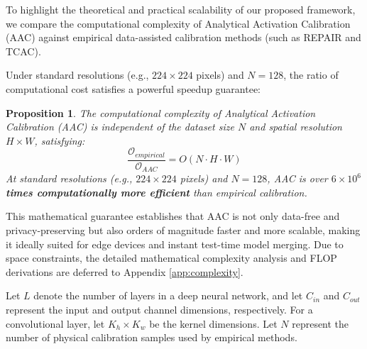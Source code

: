 \documentclass{article}
\theoremstyle{plain}
\newtheorem{proposition}[theorem]{Proposition}
\theoremstyle{definition}
\theoremstyle{remark}
\begin{document}
To highlight the theoretical and practical scalability of our proposed framework, we compare the computational complexity of Analytical Activation Calibration (AAC) against empirical data-assisted calibration methods (such as REPAIR and TCAC).

Under standard resolutions (e.g., $224 \times 224$ pixels) and $N=128$, the ratio of computational cost satisfies a powerful speedup guarantee:

\begin{proposition}
The computational complexity of Analytical Activation Calibration (AAC) is independent of the dataset size $N$ and spatial resolution $H \times W$, satisfying:
\begin{equation}
    \frac{\mathcal{O}_{empirical}}{\mathcal{O}_{AAC}} = O(N \cdot H \cdot W)
\end{equation}
At standard resolutions (e.g., $224 \times 224$ pixels) and $N=128$, AAC is over \textbf{$6 \times 10^6$ times computationally more efficient} than empirical calibration.
\end{proposition}

This mathematical guarantee establishes that AAC is not only data-free and privacy-preserving but also orders of magnitude faster and more scalable, making it ideally suited for edge devices and instant test-time model merging. Due to space constraints, the detailed mathematical complexity analysis and FLOP derivations are deferred to Appendix \ref{app:complexity}.

\iffalse

Let $L$ denote the number of layers in a deep neural network, and let $C_{in}$ and $C_{out}$ represent the input and output channel dimensions, respectively. For a convolutional layer, let $K_h \times K_w$ be the kernel dimensions. Let $N$ represent the number of physical calibration samples used by empirical methods.
\end{document}
